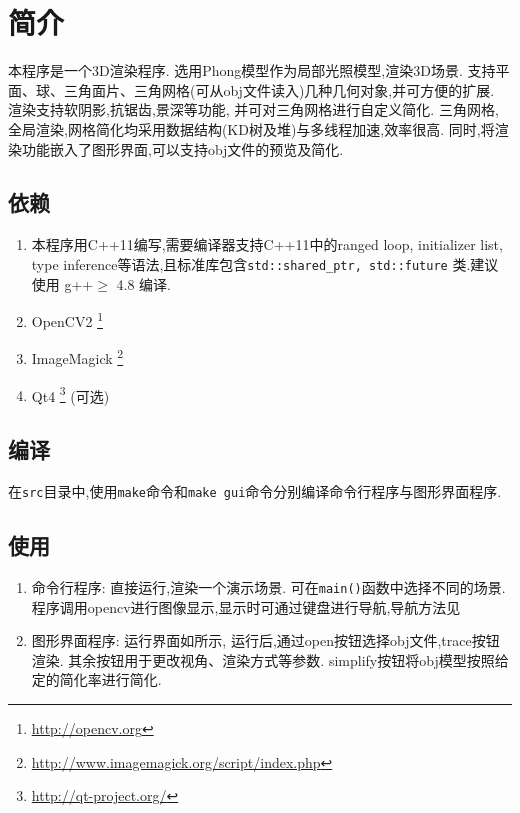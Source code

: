 
\section{简介}
本程序是一个3D渲染程序.
选用Phong模型\cite{phong}作为局部光照模型,渲染3D场景. 支持平面、球、三角面片、三角网格(可从obj文件读入)几种几何对象,并可方便的扩展.
渲染支持软阴影,抗锯齿,景深等功能, 并可对三角网格进行自定义简化.
三角网格,全局渲染,网格简化均采用数据结构(KD树及堆)与多线程加速,效率很高.
同时,将渲染功能嵌入了图形界面,可以支持obj文件的预览及简化.

\subsection{依赖}
\begin{enumerate}
  \item 本程序用C++11编写,需要编译器支持C++11中的ranged loop, initializer list, type inference等语法,且标准库包含\verb|std::shared_ptr, std::future|
    类.建议使用 g++$ \ge$ 4.8 编译.

  \item OpenCV2 \footnote{\url{http://opencv.org}}

  \item ImageMagick \footnote{\url{http://www.imagemagick.org/script/index.php}}

\item Qt4  \footnote{\url{http://qt-project.org/}} (可选)
\end{enumerate}


\subsection{编译}
在\verb|src|目录中,使用\verb|make|命令和\verb|make gui|命令分别编译命令行程序与图形界面程序.

\subsection{使用}

\begin{enumerate}
    \item 命令行程序:
      直接运行,渲染一个演示场景. 可在\verb|main()|函数中选择不同的场景.
      程序调用opencv进行图像显示,显示时可通过键盘进行导航,导航方法见

      \item 图形界面程序:
        运行界面如所示,
        运行后,通过open按钮选择obj文件,trace按钮渲染. 其余按钮用于更改视角、渲染方式等参数.
        simplify按钮将obj模型按照给定的简化率进行简化.
\end{enumerate}

